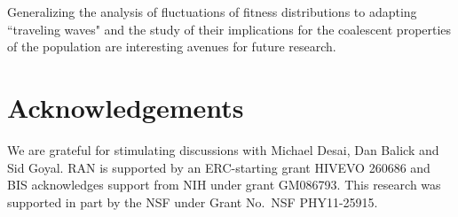 \documentclass[rmp,preprint]{revtex4}
\begin{document}

Generalizing the analysis of fluctuations of fitness distributions to adapting ``traveling waves" and the study of their implications for the coalescent properties of the population are interesting avenues for future research.

\section{Acknowledgements}
We are grateful for stimulating discussions with Michael Desai, Dan Balick and Sid Goyal.  RAN is supported by an ERC-starting grant HIVEVO 260686 and BIS acknowledges support from NIH under grant GM086793. This research was supported in part by the NSF under Grant No.~NSF PHY11-25915.



\end{document}
